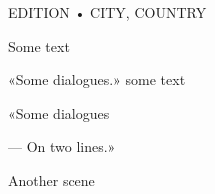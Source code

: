 \documentclass[]{novel}
\begin{document}
\frontmatter
\thispagestyle{empty}

\vspace*{7\nbs}
\begin{center}
\charscale[2.5]{\theTitle}\par
\vspace{6\nbs}
\charscale[1.5]{\theAuthor}\par
\vfill
EDITION • CITY, COUNTRY\par
\end{center} 

\mainmatter

\begin{ChapterStart}
\end{ChapterStart}

Some text

«Some dialogues.» some text

«Some dialogues

--- On two lines.»


\sceneline

Another scene

\clearpage
\end{document}
